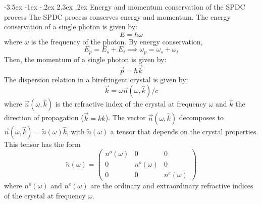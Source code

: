 \documentclass[a4paper, 12pt,oneside]{article}
\makeatletter
\renewcommand{\subsection}{\@startsection {subsection}{1}{\z@}%
             {-3.5ex \@plus -1ex \@minus -.2ex}%
             {2.3ex \@plus.2ex}%
             {\normalfont\normalsize\bfseries}}
\makeatother
\begin{document}
\subsection{Energy and momentum conservation of the SPDC process}
The SPDC process conserves energy and momentum. The energy conservation of a single photon is given by:
\begin{equation}
    E = \hbar \omega 
\end{equation}
where $\omega$ is the frequency of the photon. By energy conservation,
\begin{equation}
    E_p = E_s + E_i \implies \omega_p = \omega_s + \omega_i
\end{equation}
Then, the momentum of a single photon is given by:
\begin{equation}
    \vec{p} = \hbar \vec{k}
\end{equation}
The dispersion relation in a birefringent crystal is given by:
\begin{equation}
    \vec{k} = \omega \vec{n}(\omega,\hat{k})/c
\end{equation} 
where $\vec{n}(\omega,\hat{k})$ is the refractive index of the crystal at frequency $\omega$ and $\hat{k}$  the direction of propagation ($\vec{k} = k \hat{k}$). The vector $\vec{n}(\omega,\hat{k})$ decomposes to $\vec{n}(\omega,\hat{k}) = \tilde{n}(\omega) \hat{k}$, with $\tilde{n}(\omega)$ a tensor that depends on the crystal properties. This tensor has the form 
\begin{equation}
    \tilde{n}(\omega) = \begin{pmatrix}
        n^o(\omega) & 0 & 0 \\
        0 & n^o(\omega) & 0 \\
        0 & 0 & n^e(\omega)
    \end{pmatrix}
\end{equation}
where $n^o(\omega)$ and $n^e(\omega)$ are the ordinary and extraordinary refractive indices of the crystal at frequency $\omega$.   
\end{document}
